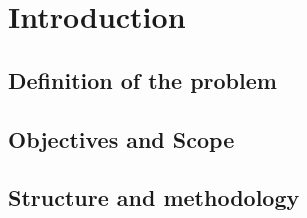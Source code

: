 \section{Introduction}
\subsection{Definition of the problem} %
\subsection{Objectives and Scope}
\subsection{Structure and methodology}
